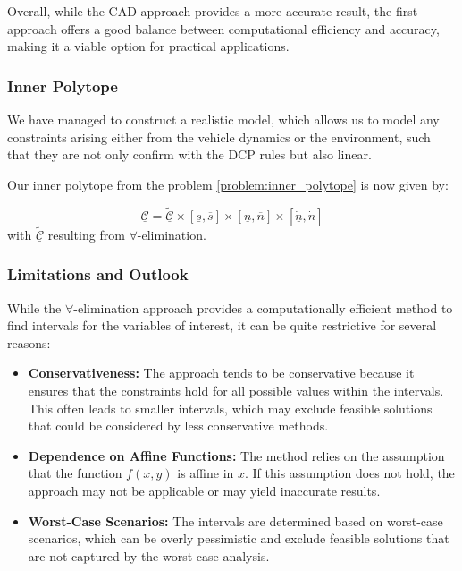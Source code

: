 Overall, while the CAD approach provides a more accurate result, the first approach offers a good balance between computational efficiency and
accuracy, making it a viable option for practical applications.

\subsubsection{Inner Polytope}

We have managed to construct a realistic model, which allows us to model any constraints arising either from the vehicle dynamics or the environment,
such that they are not only confirm with the DCP rules but also linear.

Our inner polytope from the problem \ref{problem:inner_polytope} is now given by:

\begin{equation}
	\label{eq:pm_coupling_constraints}
	\underline{\mathcal{C}} = \tilde{\underline{\mathcal{C}}} \times [\underline{s}, \overline{s}] \times [\underline{n}, \overline{n}] \times [\underline{\dot{n}}, \overline{\dot{n}}]
\end{equation}
with $\tilde{\underline{\mathcal{C}}}$ resulting from $\forall$-elimination.

\subsubsection{Limitations and Outlook}

While the $\forall$-elimination approach provides a computationally efficient method to find intervals for the variables of interest, it can be quite restrictive for several reasons:

\begin{itemize}
	\item \textbf{Conservativeness:}
	      The approach tends to be conservative because it ensures that the constraints hold for all possible values within the intervals.
	      This often leads to smaller intervals, which may exclude feasible solutions that could be considered by less conservative methods.
	\item \textbf{Dependence on Affine Functions:}
	      The method relies on the assumption that the function $f(x, y)$ is affine in $x$.
	      If this assumption does not hold, the approach may not be applicable or may yield inaccurate results.
	\item \textbf{Worst-Case Scenarios:}
	      The intervals are determined based on worst-case scenarios, which can be overly pessimistic and exclude feasible solutions that are not captured by
	      the worst-case analysis.
\end{itemize}

